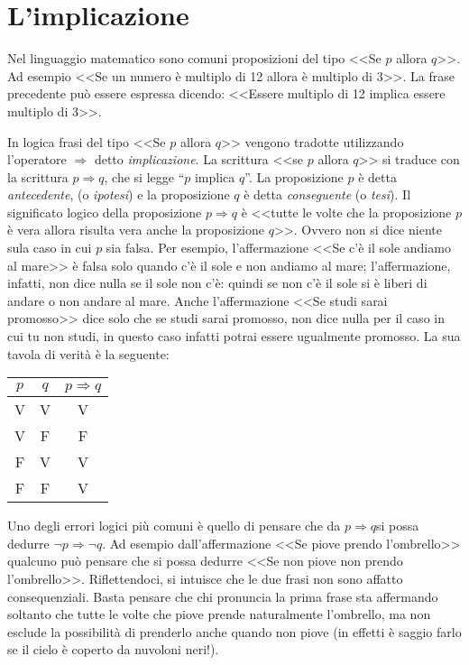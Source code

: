 \vspazio\ovalbox{\risolvii \ref{ese:6.10}, \ref{ese:6.11}}

\section{L'implicazione}

Nel linguaggio matematico sono comuni proposizioni del tipo <<Se $p$ allora $q$>>. Ad esempio <<Se un numero è multiplo di 12 allora è multiplo di 3>>. La frase precedente può essere espressa dicendo:
<<Essere multiplo di 12 implica essere multiplo di 3>>.

In logica frasi del tipo <<Se $p$ allora $q$>> vengono tradotte utilizzando l'operatore $\Rightarrow$ detto \emph{implicazione}.
La scrittura <<se $p$ allora $q$>> si traduce con la scrittura $p\Rightarrow q$, che si legge ``$p$ implica $q$''.
La proposizione $p$ è detta \emph{antecedente}, (o \emph{ipotesi}) e la proposizione $q$ è detta \emph{conseguente} (o \emph{tesi}).
Il significato logico della proposizione $p\Rightarrow q$ è <<tutte le volte che la proposizione $p$ è vera allora risulta vera anche la proposizione $q$>>. Ovvero non si dice niente sula caso in cui $p$ sia falsa.
Per esempio, l'affermazione <<Se c'è il sole andiamo al mare>> è falsa solo quando c'è il sole e non andiamo al mare; l'affermazione, infatti, non dice nulla se il sole non c'è: quindi se non c'è il sole si è liberi di andare o non andare al mare. Anche l'affermazione <<Se studi sarai promosso>> dice solo che se studi sarai promosso, non dice nulla per il caso in cui tu non studi, in questo caso infatti potrai essere ugualmente promosso.
La sua tavola di verità è la seguente:
\begin{center}
 \begin{tabular*}{.2 \textwidth}{@{\extracolsep{\fill}}*{3}{c}}
 \toprule
$p$ &$q$ &$p\Rightarrow q$\\
\midrule
V & V & V \\
V & F & F \\
F & V & V \\
F & F & V \\
\bottomrule
 \end{tabular*}
\end{center}
Uno degli errori logici più comuni è quello di pensare che da $p\Rightarrow q$si possa dedurre $\neg p\Rightarrow \neg q$.
Ad esempio dall'affermazione <<Se piove prendo l'ombrello>> qualcuno può pensare che si possa dedurre <<Se non piove non prendo l'ombrello>>. Riflettendoci, si intuisce che le due frasi non sono affatto consequenziali. Basta pensare che chi pronuncia la prima frase sta affermando soltanto che tutte le volte che piove prende naturalmente l'ombrello, ma non esclude la possibilità di prenderlo anche quando non piove (in effetti è saggio farlo se il cielo è coperto da nuvoloni neri!).

